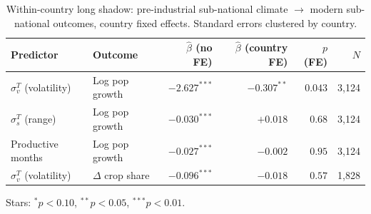 \documentclass[11pt,letterpaper]{article}
\begin{document}
\begin{table}[H]
\centering
\caption{Within-country long shadow: pre-industrial sub-national climate $\to$ modern sub-national outcomes, country fixed effects. Standard errors clustered by country.}
\label{tab:shadow-within}
\small
\begin{tabular}{llrrrr}
\toprule
Predictor & Outcome & $\hat\beta$ (no FE) & $\hat\beta$ (country FE) & $p$ (FE) & $N$ \\
\midrule
$\sigma_v^T$ (volatility)  & Log pop growth & $-2.627^{***}$ & $-0.307^{**}$ & $0.043$ & 3{,}124 \\
$\sigma_s^T$ (range)       & Log pop growth & $-0.030^{***}$ & $+0.018$      & $0.68$  & 3{,}124 \\
Productive months          & Log pop growth & $-0.027^{***}$ & $-0.002$      & $0.95$  & 3{,}124 \\
$\sigma_v^T$ (volatility)  & $\Delta$ crop share & $-0.096^{***}$ & $-0.018$  & $0.57$  & 1{,}828 \\
\bottomrule
\end{tabular}
\par\smallskip\footnotesize{Stars: $^{*}p<0.10$, $^{**}p<0.05$, $^{***}p<0.01$.}
\end{table}
\end{document}
